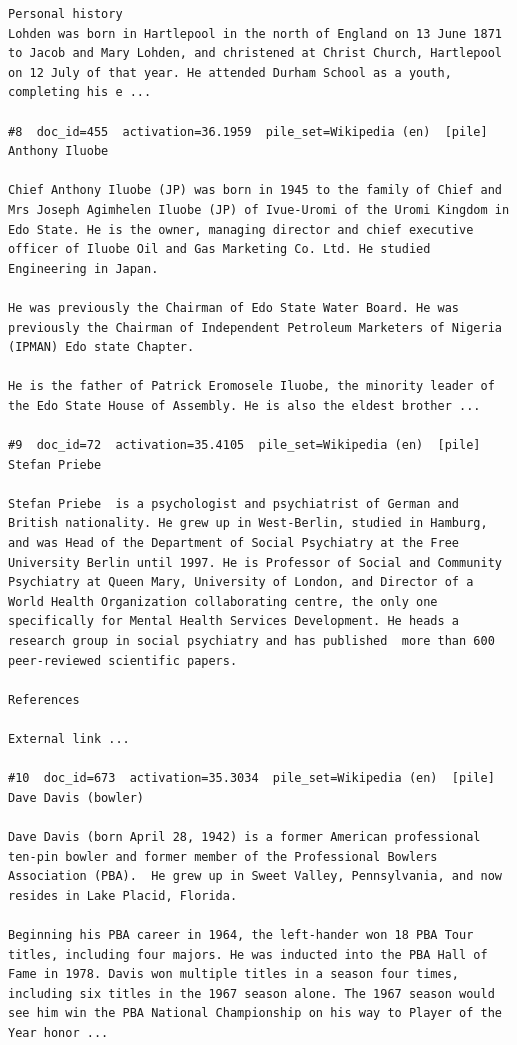 \begin{verbatim}
Personal history
Lohden was born in Hartlepool in the north of England on 13 June 1871 to Jacob and Mary Lohden, and christened at Christ Church, Hartlepool on 12 July of that year. He attended Durham School as a youth, completing his e ...

#8  doc_id=455  activation=36.1959  pile_set=Wikipedia (en)  [pile]
Anthony Iluobe

Chief Anthony Iluobe (JP) was born in 1945 to the family of Chief and Mrs Joseph Agimhelen Iluobe (JP) of Ivue-Uromi of the Uromi Kingdom in Edo State. He is the owner, managing director and chief executive officer of Iluobe Oil and Gas Marketing Co. Ltd. He studied Engineering in Japan.

He was previously the Chairman of Edo State Water Board. He was previously the Chairman of Independent Petroleum Marketers of Nigeria (IPMAN) Edo state Chapter.

He is the father of Patrick Eromosele Iluobe, the minority leader of the Edo State House of Assembly. He is also the eldest brother ...

#9  doc_id=72  activation=35.4105  pile_set=Wikipedia (en)  [pile]
Stefan Priebe

Stefan Priebe  is a psychologist and psychiatrist of German and British nationality. He grew up in West-Berlin, studied in Hamburg, and was Head of the Department of Social Psychiatry at the Free University Berlin until 1997. He is Professor of Social and Community Psychiatry at Queen Mary, University of London, and Director of a World Health Organization collaborating centre, the only one specifically for Mental Health Services Development. He heads a research group in social psychiatry and has published  more than 600 peer-reviewed scientific papers.

References

External link ...

#10  doc_id=673  activation=35.3034  pile_set=Wikipedia (en)  [pile]
Dave Davis (bowler)

Dave Davis (born April 28, 1942) is a former American professional ten-pin bowler and former member of the Professional Bowlers Association (PBA).  He grew up in Sweet Valley, Pennsylvania, and now resides in Lake Placid, Florida.

Beginning his PBA career in 1964, the left-hander won 18 PBA Tour titles, including four majors. He was inducted into the PBA Hall of Fame in 1978. Davis won multiple titles in a season four times, including six titles in the 1967 season alone. The 1967 season would see him win the PBA National Championship on his way to Player of the Year honor ...

\end{verbatim}

